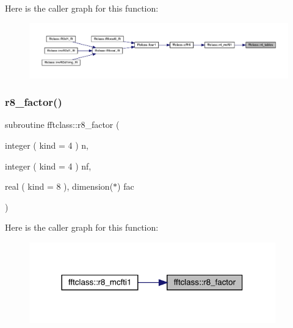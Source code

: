 Here is the caller graph for this function\+:\nopagebreak
\begin{figure}[H]
\begin{center}
\leavevmode
\includegraphics[width=350pt]{namespacefftclass_a882cd8d6eeb407d2b10ee9b3d9fee8b9_icgraph}
\end{center}
\end{figure}
\mbox{\label{namespacefftclass_a22bddf5efe99e8dcd5737d2d73ae832f}} 
\subsubsection{\texorpdfstring{r8\_factor()}{r8\_factor()}}
{\footnotesize\ttfamily subroutine fftclass\+::r8\+\_\+factor (\begin{DoxyParamCaption}\item[{integer ( kind = 4 )}]{n,  }\item[{integer ( kind = 4 )}]{nf,  }\item[{real ( kind = 8 ), dimension($\ast$)}]{fac }\end{DoxyParamCaption})}

Here is the caller graph for this function\+:\nopagebreak
\begin{figure}[H]
\begin{center}
\leavevmode
\includegraphics[width=302pt]{namespacefftclass_a22bddf5efe99e8dcd5737d2d73ae832f_icgraph}
\end{center}
\end{figure}
\mbox{\label{namespacefftclass_a89d64713ecbaec08b4d5180fcbc56cea}} 
